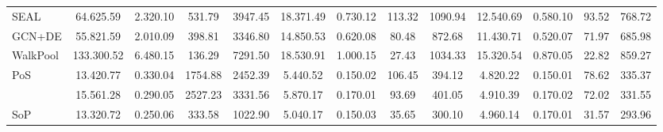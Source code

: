 \documentclass[sigconf, nonacm]{acmart}
\newcommand{\posplus}{\xspace}
\newcommand{\pos}{{P\lowercase{o}S}\xspace}
\newcommand{\sop}{{S\lowercase{o}P}\xspace}
\newcommand{\worst}{\cellcolor[rgb]{0.957,0.8,0.8}}
\newcommand{\best}{\cellcolor[rgb]{0.851,0.918,0.827}}
\begin{document}
\begin{table*}[h!]
{\begin{tabular}{l|cccc|cccc|cccc}
\hline
SEAL                        & 64.62{\scriptsize5.59}                                      & 2.32{\scriptsize0.10}                                     & \worst531.79     & 3947.45                                     & 18.37{\scriptsize1.49}                                     & 0.73{\scriptsize0.12}                                     & \worst113.32    & \worst1090.94    & 12.54{\scriptsize0.69}                                     & 0.58{\scriptsize0.10}                                     & \worst93.52      & 768.72                                       \\
GCN+DE                      & \best55.82{\scriptsize1.59}  & \best2.01{\scriptsize0.09} & 398.81                                     & \best3346.80 & \best14.85{\scriptsize0.53} & \best0.62{\scriptsize0.08} & 80.48                                     & \best872.68 & \best11.43{\scriptsize0.71} & \best0.52{\scriptsize0.07} & 71.97                                      & \best685.98   \\
WalkPool                    & \worst133.30{\scriptsize0.52}     & \worst6.48{\scriptsize0.15}     & \best136.29 & \worst7291.50     & \worst18.53{\scriptsize0.91}     & \worst1.00{\scriptsize0.15}     & \best27.43 & 1034.33                                    & \worst15.32{\scriptsize0.54}     & \worst0.87{\scriptsize0.05}     & \best22.82  & \worst859.27       \\ 
\hline
\pos                         & 13.42{\scriptsize0.77}                                      & \worst0.33{\scriptsize0.04}     & 1754.88                                    & 2452.39                                     & 5.44{\scriptsize0.52}                                      & \best0.15{\scriptsize0.02} & \worst106.45    & 394.12                                     & \best4.82{\scriptsize0.22}  & \best0.15{\scriptsize0.01} & \worst78.62      & \worst335.37       \\
\posplus                       & \worst15.56{\scriptsize1.28}      & 0.29{\scriptsize0.05}                                     & \worst2527.23    & \worst3331.56     & \worst5.87{\scriptsize0.17}      & \worst0.17{\scriptsize0.01}     & 93.69                                     & \worst401.05     & 4.91{\scriptsize0.39}                                      & \worst0.17{\scriptsize0.02}     & 72.02                                      & 331.55                                       \\
\sop                         & \best13.32{\scriptsize0.72}  & \best0.25{\scriptsize0.06} & \best333.58 & \best1022.90 & \best5.04{\scriptsize0.17}  & 0.15{\scriptsize0.03}                                     & \best35.65 & \best300.10 & \worst4.96{\scriptsize0.14}      & 0.17{\scriptsize0.01}                                     & \best31.57  & \best293.96   \\ 

\end{tabular}}
\end{table*}
\end{document}
